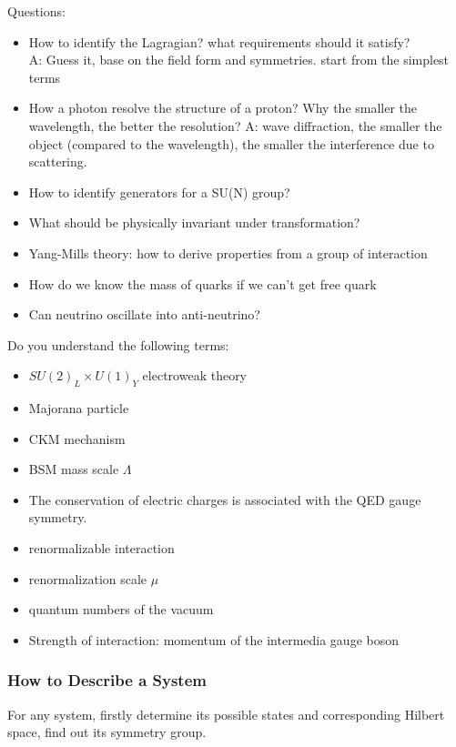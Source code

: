Questions:
\begin{itemize}
    \item How to identify the Lagragian? what requirements should it satisfy?	\\
	A: Guess it, base on the field form and symmetries. start from the 
	simplest terms
    \item How a photon resolve the structure of a proton? Why the smaller the 
	wavelength, the better the resolution?
	A: wave diffraction, the smaller the object (compared to the wavelength),
	the smaller the interference due to scattering.

    \item How to identify generators for a SU(N) group?
    \item What should be physically invariant under transformation?
    \item Yang-Mills theory: how to derive properties from a group of interaction
    \item How do we know the mass of quarks if we can't get free quark
    \item Can neutrino oscillate into anti-neutrino?
\end{itemize}

Do you understand the following terms:
\begin{itemize}
    \item $SU(2)_L \times U(1)_Y$ electroweak theory
    \item Majorana particle
    \item CKM mechanism
    \item BSM mass scale $\Lambda$
    \item The conservation of electric charges is associated with the QED gauge symmetry. 
    \item renormalizable interaction
    \item renormalization scale $\mu$
    \item quantum numbers of the vacuum
    \item Strength of interaction: momentum of the intermedia gauge boson
\end{itemize}
\subsubsection{How to Describe a System}
For any system, firstly determine its possible states and corresponding Hilbert 
space, find out its symmetry group.

